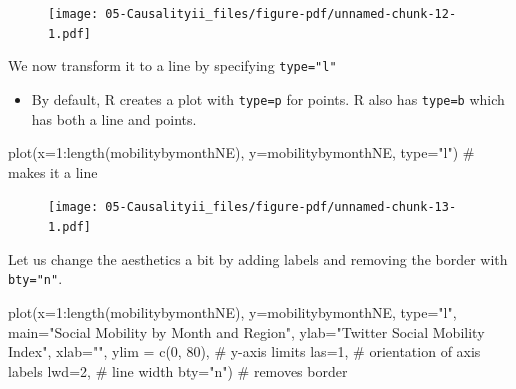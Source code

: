 \documentclass[
  letterpaper,
  DIV=11,
  numbers=noendperiod]{scrreprt}
\newenvironment{Shaded}{\begin{snugshade}}{\end{snugshade}}
\newcommand{\AttributeTok}[1]{\textcolor[rgb]{0.40,0.45,0.13}{#1}}
\newcommand{\CommentTok}[1]{\textcolor[rgb]{0.37,0.37,0.37}{#1}}
\newcommand{\DecValTok}[1]{\textcolor[rgb]{0.68,0.00,0.00}{#1}}
\newcommand{\FunctionTok}[1]{\textcolor[rgb]{0.28,0.35,0.67}{#1}}
\newcommand{\NormalTok}[1]{\textcolor[rgb]{0.00,0.23,0.31}{#1}}
\newcommand{\SpecialCharTok}[1]{\textcolor[rgb]{0.37,0.37,0.37}{#1}}
\newcommand{\StringTok}[1]{\textcolor[rgb]{0.13,0.47,0.30}{#1}}
\providecommand{\tightlist}{%
  \setlength{\itemsep}{0pt}\setlength{\parskip}{0pt}}\usepackage{longtable,booktabs,array}
\begin{document}
\begin{figure}[H]

{\centering \texttt{[image: 05-Causalityii\_files/figure-pdf/unnamed-chunk-12-1.pdf]}

}

\end{figure}

We now transform it to a line by specifying \texttt{type="l"}

\begin{itemize}
\tightlist
\item
  By default, R creates a plot with \texttt{type=p} for points. R also
  has \texttt{type=b} which has both a line and points.
\end{itemize}

\begin{Shaded}
\begin{Highlighting}[]
\FunctionTok{plot}\NormalTok{(}\AttributeTok{x=}\DecValTok{1}\SpecialCharTok{:}\FunctionTok{length}\NormalTok{(mobilitybymonthNE),}
     \AttributeTok{y=}\NormalTok{mobilitybymonthNE, }\AttributeTok{type=}\StringTok{"l"}\NormalTok{) }\CommentTok{\# makes it a line}
\end{Highlighting}
\end{Shaded}

\begin{figure}[H]

{\centering \texttt{[image: 05-Causalityii\_files/figure-pdf/unnamed-chunk-13-1.pdf]}

}

\end{figure}

Let us change the aesthetics a bit by adding labels and removing the
border with \texttt{bty="n"}.

\begin{Shaded}
\begin{Highlighting}[]
\FunctionTok{plot}\NormalTok{(}\AttributeTok{x=}\DecValTok{1}\SpecialCharTok{:}\FunctionTok{length}\NormalTok{(mobilitybymonthNE),}
     \AttributeTok{y=}\NormalTok{mobilitybymonthNE,}
     \AttributeTok{type=}\StringTok{"l"}\NormalTok{, }
     \AttributeTok{main=}\StringTok{"Social Mobility by Month and Region"}\NormalTok{,}
     \AttributeTok{ylab=}\StringTok{"Twitter Social Mobility Index"}\NormalTok{,}
     \AttributeTok{xlab=}\StringTok{""}\NormalTok{,}
     \AttributeTok{ylim =} \FunctionTok{c}\NormalTok{(}\DecValTok{0}\NormalTok{, }\DecValTok{80}\NormalTok{), }\CommentTok{\# y{-}axis limits}
     \AttributeTok{las=}\DecValTok{1}\NormalTok{, }\CommentTok{\# orientation of axis labels}
     \AttributeTok{lwd=}\DecValTok{2}\NormalTok{, }\CommentTok{\# line width}
     \AttributeTok{bty=}\StringTok{"n"}\NormalTok{) }\CommentTok{\# removes border}
\end{Highlighting}
\end{Shaded}
\end{document}
